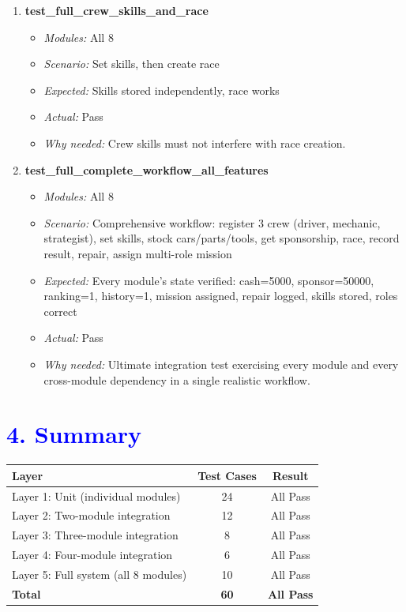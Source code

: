 \documentclass{article}
\begin{document}
\begin{enumerate}[resume, label=\textbf{TC\arabic*.}]
\item \textbf{test\_full\_crew\_skills\_and\_race}
\begin{itemize}[noitemsep]
  \item \textit{Modules:} All 8
  \item \textit{Scenario:} Set skills, then create race
  \item \textit{Expected:} Skills stored independently, race works
  \item \textit{Actual:} Pass
  \item \textit{Why needed:} Crew skills must not interfere with race creation.
\end{itemize}

\item \textbf{test\_full\_complete\_workflow\_all\_features}
\begin{itemize}[noitemsep]
  \item \textit{Modules:} All 8
  \item \textit{Scenario:} Comprehensive workflow: register 3 crew (driver, mechanic, strategist), set skills, stock cars/parts/tools, get sponsorship, race, record result, repair, assign multi-role mission
  \item \textit{Expected:} Every module's state verified: cash=5000, sponsor=50000, ranking=1, history=1, mission assigned, repair logged, skills stored, roles correct
  \item \textit{Actual:} Pass
  \item \textit{Why needed:} Ultimate integration test exercising every module and every cross-module dependency in a single realistic workflow.
\end{itemize}

\end{enumerate}


\section*{\textcolor{blue}{4. Summary}}

\begin{center}
\begin{tabular}{lcc}
\toprule
Layer & Test Cases & Result \\
\midrule
Layer 1: Unit (individual modules) & 24 & All Pass \\
Layer 2: Two-module integration & 12 & All Pass \\
Layer 3: Three-module integration & 8 & All Pass \\
Layer 4: Four-module integration & 6 & All Pass \\
Layer 5: Full system (all 8 modules) & 10 & All Pass \\
\midrule
\textbf{Total} & \textbf{60} & \textbf{All Pass} \\
\bottomrule
\end{tabular}
\end{center}
\end{document}
